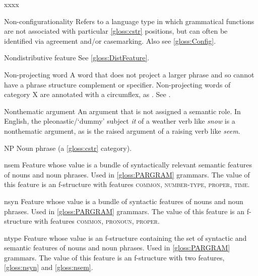 \documentclass[output=paper,colorlinks,citecolor=brown]{langscibook}
\begin{document}
\begin{labeling}{xxxx}\sloppy %
 
\item[Non-configurationality\namedlabel{gloss:Nonconfig}{Non-configurationality}] Refers to a language type in which grammatical functions are not associated with particular \ref{gloss:cstr} positions, but can often be identified via agreement and/or casemarking.  Also see \ref{gloss:Config}.

\item[Nondistributive feature] See \ref{gloss:DistFeature}.

\item[Non-projecting word\namedlabel{gloss:Nonproj}{Non-projecting word}] A word that does not project a larger phrase and so cannot have a phrase structure complement or specifier.  Non-projecting words of category X are annotated with a circumflex, as .  See \citetv[\ref{sect:xbar}]{chapters/CoreConcepts}.

\item[Nonthematic argument\namedlabel{gloss:nonthematicarguments}{nonthematic arguments}] An argument that is not assigned a semantic role.  In English, the pleonastic/`dummy' subject \emph{it} of a weather verb like \emph{snow} is a nonthematic argument, as is the raised argument of a raising verb like \emph{seem}.

\item[NP\namedlabel{gloss:NP}{NP}] Noun phrase (a \ref{gloss:cstr} category).

\item[nsem\namedlabel{gloss:nsem}{\textsc{nsem}}] Feature whose value is a bundle of syntactically relevant semantic features of nouns and noun phrases.  Used in \ref{gloss:PARGRAM} grammars.  The value of this feature is an f-structure with features \textsc{common, number-type, proper, time}.

\item[nsyn\namedlabel{gloss:nsyn}{\textsc{nsyn}}] Feature whose value is a bundle of syntactic features of nouns and noun phrases.  Used in \ref{gloss:PARGRAM} grammars.  The value of this feature is an f-structure with features \textsc{common, pronoun, proper}.

\item[ntype] Feature whose value is an f-structure containing the set of syntactic and semantic features of nouns and noun phrases.  Used in \ref{gloss:PARGRAM} grammars. The value of this feature is an f-structure with two features, \ref{gloss:nsyn} and \ref{gloss:nsem}.


\end{labeling}
\end{document}
